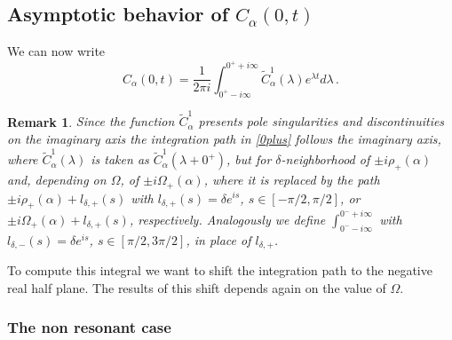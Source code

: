 \documentclass[11pt]{article}
\numberwithin{equation}{section}
\newtheorem{rmk}[theorem]{Remark}
\numberwithin{theorem}{section}
\newcommand{\matht}[1]{\texorpdfstring{#1}{}}
\def\tilde#1{\widetilde{#1}}
\begin{document}
\subsection{Asymptotic behavior of \matht{$C_\alpha(0,t)$}}\label{subsec:asym}

We can now write
\begin{equation}\label{0plus}
 C_\alpha(0,t)=\frac{1}{2\pi i}\int_{0^+-i\infty}^{0^++i\infty}\tilde
C^1_\alpha(\lambda)e^{\lambda
t}d\lambda\,.
\end{equation}

\begin{rmk}\label{rmk:00+}\emph{
Since the function $\tilde C^1_\alpha$ presents pole singularities and discontinuities on the imaginary axis the
integration path in \eqref{0plus} follows the imaginary axis, where $\widetilde C^1_\alpha(\lambda)$ is taken as
$\widetilde C^1_\alpha(\lambda+0^+)$, but for $\delta$-neighborhood of $\pm i\rho_+(\alpha)$ and, depending on $\Omega$,
of  $\pm i\Omega_+(\alpha)$, where it is replaced by the path $\pm i\rho_+(\alpha)+l_{\delta,+}(s)$ with
$l_{\delta,+}(s)=\delta e^{i s}$, $s\in [-\pi/2,\pi/2]$, or $\pm i\Omega_+(\alpha)+l_{\delta,+}(s)$, respectively.
Analogously we define $\int_{0^--i\infty}^{0^-+i\infty}$ with $l_{\delta,-}(s)=\delta e^{i s}$, $s\in [\pi/2,3\pi/2]$, in
place of $l_{\delta,+}$.}
\end{rmk}

To compute this integral we want to shift the integration path to the negative real half plane. The results of this
shift depends again on the value of $\Omega$.


\subsubsection{The non resonant case}\label{subsec:nonr}
\end{document}
